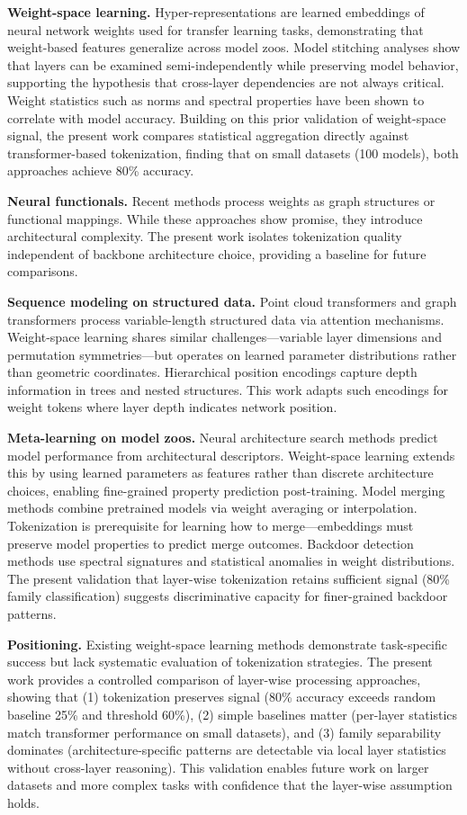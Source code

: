 
\textbf{Weight-space learning.} Hyper-representations are learned embeddings of neural network weights used for transfer learning tasks, demonstrating that weight-based features generalize across model zoos. Model stitching analyses show that layers can be examined semi-independently while preserving model behavior, supporting the hypothesis that cross-layer dependencies are not always critical. Weight statistics such as norms and spectral properties have been shown to correlate with model accuracy. Building on this prior validation of weight-space signal, the present work compares statistical aggregation directly against transformer-based tokenization, finding that on small datasets (100 models), both approaches achieve 80\% accuracy.

\textbf{Neural functionals.} Recent methods process weights as graph structures or functional mappings. While these approaches show promise, they introduce architectural complexity. The present work isolates tokenization quality independent of backbone architecture choice, providing a baseline for future comparisons.

\textbf{Sequence modeling on structured data.} Point cloud transformers and graph transformers process variable-length structured data via attention mechanisms. Weight-space learning shares similar challenges---variable layer dimensions and permutation symmetries---but operates on learned parameter distributions rather than geometric coordinates. Hierarchical position encodings capture depth information in trees and nested structures. This work adapts such encodings for weight tokens where layer depth indicates network position.

\textbf{Meta-learning on model zoos.} Neural architecture search methods predict model performance from architectural descriptors. Weight-space learning extends this by using learned parameters as features rather than discrete architecture choices, enabling fine-grained property prediction post-training. Model merging methods combine pretrained models via weight averaging or interpolation. Tokenization is prerequisite for learning how to merge---embeddings must preserve model properties to predict merge outcomes. Backdoor detection methods use spectral signatures and statistical anomalies in weight distributions. The present validation that layer-wise tokenization retains sufficient signal (80\% family classification) suggests discriminative capacity for finer-grained backdoor patterns.

\textbf{Positioning.} Existing weight-space learning methods demonstrate task-specific success but lack systematic evaluation of tokenization strategies. The present work provides a controlled comparison of layer-wise processing approaches, showing that (1) tokenization preserves signal (80\% accuracy exceeds random baseline 25\% and threshold 60\%), (2) simple baselines matter (per-layer statistics match transformer performance on small datasets), and (3) family separability dominates (architecture-specific patterns are detectable via local layer statistics without cross-layer reasoning). This validation enables future work on larger datasets and more complex tasks with confidence that the layer-wise assumption holds.

